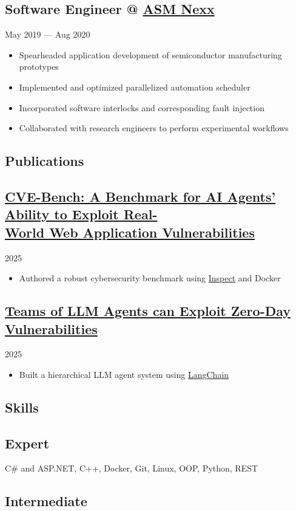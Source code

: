 \documentclass[11pt, letterpaper]{article}
\newcommand{\datedsubsection}[2]{
    \titleformat{\subsection}[runin]{\normalfont\normalsize\bfseries}{\thesection}{}{}
    \subsection*{#1}
    \hfill#2
    \titleformat{\subsection}[hang]{\normalfont\normalsize\bfseries}{\thesection}{}{}
}
\begin{document}
\datedsubsection{Software Engineer @ \href{https://www.crunchbase.com/organization/asm-nexx}{ASM Nexx}}{May 2019 --- Aug 2020}
\begin{itemize}
    \item Spearheaded application development of semiconductor manufacturing prototypes
    \item Implemented and optimized parallelized automation scheduler
    \item Incorporated software interlocks and corresponding fault injection
    \item Collaborated with research engineers to perform experimental workflows
\end{itemize}

\textcolor{header}{\section*{Publications}}\label{sec:publications}

\datedsubsection{\href{https://arxiv.org/abs/2503.17332}{CVE-Bench: A Benchmark for AI Agents' Ability to Exploit Real-\\ World Web Application Vulnerabilities}}{2025}
\begin{itemize}
    \item Authored a robust cybersecurity benchmark using \href{https://inspect.aisi.org.uk/}{Inspect} and Docker
\end{itemize}

\datedsubsection{\href{https://arxiv.org/abs/2406.01637}{Teams of LLM Agents can Exploit Zero-Day Vulnerabilities}}{2025}
\begin{itemize}
    \item Built a hierarchical LLM agent system using \href{https://www.langchain.com/}{LangChain}
\end{itemize}


\textcolor{header}{\section*{Skills}}\label{sec:skills}

\subsection*{Expert}

C\# and ASP.NET, C++, Docker, Git, Linux, OOP, Python, REST

\subsection*{Intermediate}
\end{document}
